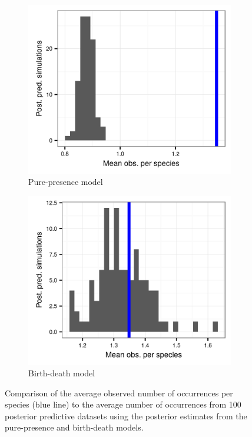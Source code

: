 

\begin{figure}[ht]
  \begin{subfigure}[b]{0.45\textwidth}
    \includegraphics[width=\textwidth,height=0.3\textheight,keepaspectratio=true]{chapter_coping/figure/pred_occ}
    \caption{Pure-presence model}
    \label{fig:ppc_pure_presence}
  \end{subfigure}
  \begin{subfigure}[b]{0.45\textwidth}
    \includegraphics[width=\textwidth,height=0.3\textheight,keepaspectratio=true]{chapter_coping/figure/pred_occ_bd}
    \caption{Birth-death model}
    \label{fig:ppc_birth_death}
  \end{subfigure}
  \caption[Posterior predictive check of average occurrence]{Comparison of the average observed number of occurrences per species (blue line) to the average number of occurrences from 100 posterior predictive datasets using the posterior estimates from the pure-presence and birth-death models.}
  \label{fig:ppc}
\end{figure}

